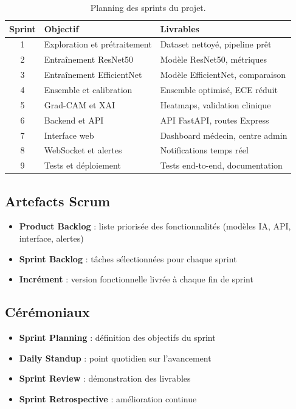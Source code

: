 \documentclass[12pt,a4paper,oneside]{report}
\begin{document}
\begin{table}[H]
\centering
\caption{Planning des sprints du projet.}
\label{tab:sprints}
\begin{tabular}{|c|l|l|}
\hline
\textbf{Sprint} & \textbf{Objectif} & \textbf{Livrables} \\
\hline
1 & Exploration et prétraitement & Dataset nettoyé, pipeline prêt \\
2 & Entraînement ResNet50 & Modèle ResNet50, métriques \\
3 & Entraînement EfficientNet & Modèle EfficientNet, comparaison \\
4 & Ensemble et calibration & Ensemble optimisé, ECE réduit \\
5 & Grad-CAM et XAI & Heatmaps, validation clinique \\
6 & Backend et API & API FastAPI, routes Express \\
7 & Interface web & Dashboard médecin, centre admin \\
8 & WebSocket et alertes & Notifications temps réel \\
9 & Tests et déploiement & Tests end-to-end, documentation \\
\hline
\end{tabular}
\end{table}

\subsection{Artefacts Scrum}

\begin{itemize}
    \item \textbf{Product Backlog} : liste priorisée des fonctionnalités
          (modèles IA, API, interface, alertes)
    \item \textbf{Sprint Backlog} : tâches sélectionnées pour chaque sprint
    \item \textbf{Incrément} : version fonctionnelle livrée à chaque fin
          de sprint
\end{itemize}

\subsection{Cérémoniaux}

\begin{itemize}
    \item \textbf{Sprint Planning} : définition des objectifs du sprint
    \item \textbf{Daily Standup} : point quotidien sur l'avancement
    \item \textbf{Sprint Review} : démonstration des livrables
    \item \textbf{Sprint Retrospective} : amélioration continue
\end{itemize}
\end{document}
